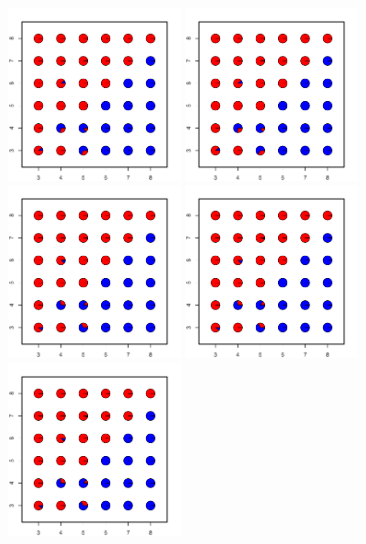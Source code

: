 \documentclass[12pt]{article}
\begin{document}
\begin{figure}
	\centering
			{\includegraphics[width=1.8in,height=1.8in]{figs/sims/simK2_sp_pies_K2.pdf}}
			{\includegraphics[width=1.8in,height=1.8in]{figs/sims/simK2_sp_pies_K3.pdf}}
			{\includegraphics[width=1.8in,height=1.8in]{figs/sims/simK2_sp_pies_K4.pdf}}
			{\includegraphics[width=1.8in,height=1.8in]{figs/sims/simK2_sp_pies_K5.pdf}}
			{\includegraphics[width=1.8in,height=1.8in]{figs/sims/simK2_sp_pies_K6.pdf}}

\end{figure}
\end{document}
